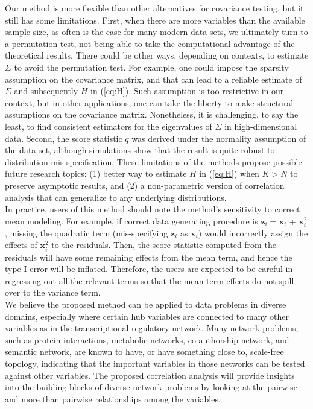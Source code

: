 \documentclass[aoas,authoryear, preprint]{imsart}
\numberwithin{equation}{section}
\theoremstyle{plain}
\begin{document}
Our method is more flexible than other alternatives for covariance testing, but it still has some limitations. First, when there are more variables than the available sample size, as often is the case for many modern data sets, we ultimately turn to a permutation test, not being able to take the computational advantage of the theoretical results. There could be other ways, depending on contexts, to estimate $\Sigma$ to avoid the permutation test. For example, one could impose the sparsity assumption on the covariance matrix, and that can lead to a reliable estimate of $\Sigma$ and subsequently $H$ in (\ref{eq:H}). Such assumption is too restrictive in our context, but in other applications, one can take the liberty to make structural assumptions on the covariance matrix. Nonetheless, it is challenging, to say the least, to find consistent estimators for the eigenvalues of $\Sigma$ in high-dimensional data. Second, the score statistic $q$ was derived under the normality assumption of the data set, although simulations show that the result is quite robust to distribution mis-specification. These limitations of the methods propose possible future research topics: (1) better way to estimate $H$ in (\ref{eq:H}) when $K > N$ to preserve asymptotic results, and (2) a non-parametric version of correlation analysis that can generalize to any underlying distributions. \\

In practice, users of this method should note the method's sensitivity to correct mean modeling. For example, if correct data generating procedure is $\bm{z}_i = \bm{x}_i$ + $\bm{x}_i^2$, missing the quadratic term (mis-specifying $\bm{z}_i$ as $\bm{x}_i$) would incorrectly assign the effects of $\bm{x}_i^2$ to the residuals. Then, the score statistic computed from the residuals will have some remaining effects from the mean term, and hence the type I error will be inflated. Therefore, the users are expected to be careful in regressing out all the relevant terms so that the mean term effects do not spill over to the variance term.\\ 

We believe the proposed method can be applied to data problems in diverse domains, especially where certain hub variables are connected to many other variables as in the transcriptional regulatory network. Many network problems, such as protein interactions, metabolic networks, co-authorship network, and semantic network, are known to have, or have something close to, scale-free topology, indicating that the important variables in those networks can be tested against other variables. The proposed correlation analysis will provide insights into the building blocks of diverse network problems by looking at the pairwise and more than pairwise relationships among the variables.
\end{document}
